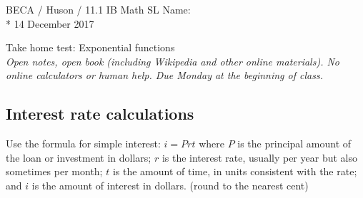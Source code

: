 \documentclass[]{book}
\begin{document}
\noindent BECA / Huson / 11.1 IB Math SL \hspace{2in} Name:\\*
14 December 2017
\begin{center}
{\Large Take home test: Exponential functions}\\
\textit{Open notes, open book (including Wikipedia and other online materials). No online calculators or human help. Due Monday at the beginning of class.}
\end{center}

\subsection*{Interest rate calculations}

Use the formula for simple interest: $i=Prt$ where $P$ is the principal amount of the loan or investment in dollars; $r$ is the interest rate, usually per year but also sometimes per month; $t$ is the amount of time, in units consistent with the rate; and $i$ is the amount of interest in dollars. (round to the nearest cent)
\end{document}
